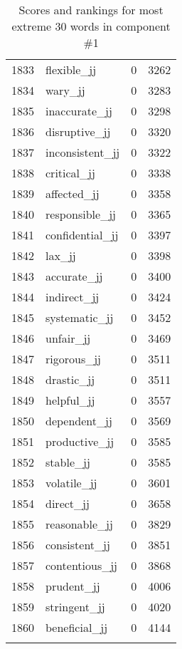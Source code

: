 \begin{longtable}[!htbp]{| rlr@{.}l |}
    1833 & flexible\_jj & 0 & 3262 \\
    1834 & wary\_jj & 0 & 3283 \\
    1835 & inaccurate\_jj & 0 & 3298 \\
    1836 & disruptive\_jj & 0 & 3320 \\
    1837 & inconsistent\_jj & 0 & 3322 \\
    1838 & critical\_jj & 0 & 3338 \\
    1839 & affected\_jj & 0 & 3358 \\
    1840 & responsible\_jj & 0 & 3365 \\
    1841 & confidential\_jj & 0 & 3397 \\
    1842 & lax\_jj & 0 & 3398 \\
    1843 & accurate\_jj & 0 & 3400 \\
    1844 & indirect\_jj & 0 & 3424 \\
    1845 & systematic\_jj & 0 & 3452 \\
    1846 & unfair\_jj & 0 & 3469 \\
    1847 & rigorous\_jj & 0 & 3511 \\
    1848 & drastic\_jj & 0 & 3511 \\
    1849 & helpful\_jj & 0 & 3557 \\
    1850 & dependent\_jj & 0 & 3569 \\
    1851 & productive\_jj & 0 & 3585 \\
    1852 & stable\_jj & 0 & 3585 \\
    1853 & volatile\_jj & 0 & 3601 \\
    1854 & direct\_jj & 0 & 3658 \\
    1855 & reasonable\_jj & 0 & 3829 \\
    1856 & consistent\_jj & 0 & 3851 \\
    1857 & contentious\_jj & 0 & 3868 \\
    1858 & prudent\_jj & 0 & 4006 \\
    1859 & stringent\_jj & 0 & 4020 \\
    1860 & beneficial\_jj & 0 & 4144 \\
    \hline
    \caption{Scores and rankings for most extreme 30 words in component \#1} \\
\end{longtable}
